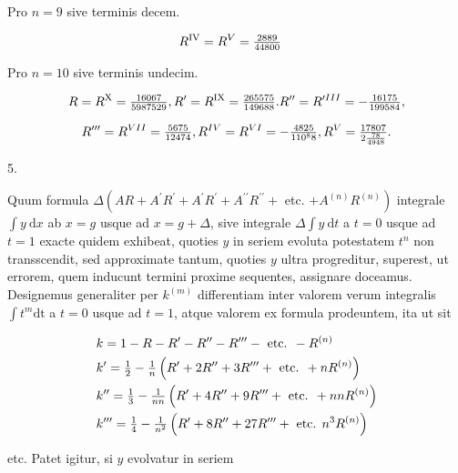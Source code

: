 \documentclass[twoside,12pt, showframe]{memoir}
\let\oldfrac\frac
\def\frac#1#2{\mathchoice{\tfrac{#1}{#2}}{\oldfrac{#1}{#2}}{\genfrac{}{}{}{2}{#1}{#2\mathstrut}}{\genfrac{}{}{}{3}{#1}{#2\mathstrut}}}
\begin{document}
Pro \(n=9\) sive terminis decem.

\begin{center}
\end{center}

\[
\begin{aligned}
& R^{\mathrm{IV}}=R^{V}=\frac{2889}{44800}
\end{aligned}
\]

Pro \(n=10\) sive terminis undecim.

\[
R=R^{\mathrm{X}}=\frac{16067}{5987529}, R^{\prime}=R^{\mathrm{IX}}=\frac{265575}{149688} . R^{\prime \prime}=R^{\prime I I I}=-\frac{16175}{199584},
\]

\[
R^{\prime \prime \prime}=R^{V I I}=\frac{5675}{12474}, R^{I V}=R^{V I}=-\frac{4825}{110^{8} 8}, R^{V}=\frac{17807}{2 \frac{78}{4948}} .
\]

5.

Quum formula \(\Delta\left(A R+A^{\prime} R^{\prime}+A^{\prime} R^{\prime}+A^{\prime \prime} R^{\prime \prime}+\right.\) etc. \(\left.+A^{(n)} R^{(n)}\right)\) integrale \(\int y \mathrm{~d} x\) ab \(x=g\) usque ad \(x=g+\Delta\), sive integrale \(\Delta \int y \mathrm{~d} t\) a \(t=0\) usque ad \(t=1\) exacte quidem exhibeat, quoties \(y\) in seriem evoluta potestatem \(t^{n}\) non transscendit, sed approximate tantum, quoties \(y\) ultra progreditur, superest, ut errorem, quem inducunt termini proxime sequentes, assignare doceamus. Designemus generaliter per \(k^{(m)}\) differentiam inter valorem verum integralis \(\int t^{m} \mathrm{dt}\) a \(t=0\) usque ad \(t=1\), atque valorem ex formula prodeuntem, ita ut sit

\[
\begin{aligned}
& k=1-R-R^{\prime}-R^{\prime \prime}-R^{\prime \prime \prime}-\text { etc. }-R^{(n)} \\
& k^{\prime}=\frac{1}{2}-\frac{1}{n}\left(R^{\prime}+2 R^{\prime \prime}+3 R^{\prime \prime \prime}+\text { etc. }+n R^{(n)}\right) \\
& k^{\prime \prime}=\frac{1}{3}-\frac{1}{n n}\left(R^{\prime}+4 R^{\prime \prime}+9 R^{\prime \prime \prime}+\text { etc. }+n n R^{(n)}\right) \\
& k^{\prime \prime \prime}=\frac{1}{4}-\frac{1}{n^{2}}\left(R^{\prime}+8 R^{\prime \prime}+27 R^{\prime \prime \prime}+\text { etc. } n^{3} R^{(n)}\right)
\end{aligned}
\]

etc. Patet igitur, si \(y\) evolvatur in seriem
\end{document}
